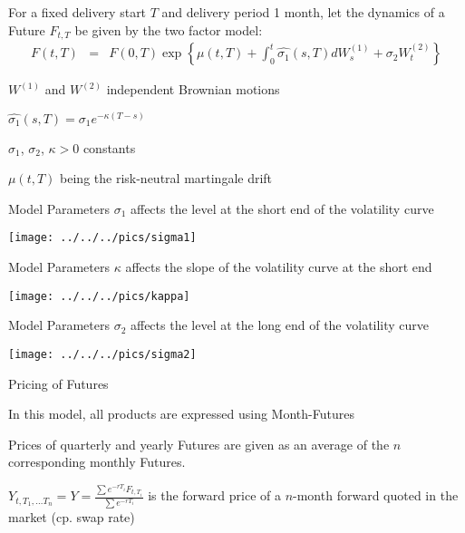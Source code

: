 


	For a fixed delivery start $T$ and delivery period 1 month, let the dynamics of a Future $F_{t,T}$ be given by the two factor model:
\begin{eqnarray*}
F(t,T)& =&F(0,T)\exp\left\{\mu(t,T)  +\int_0^t\hat{\sigma_1}(s,T)dW_s^{(1)}+\sigma_2W_t^{(2)}\right\}
\end{eqnarray*}

	$W^{(1)}$ and $W^{(2)}$ independent Brownian motions

	$\hat{\sigma_1}(s,T)=\sigma_1e^{-\kappa(T-s)}$

	$\sigma_1$, $\sigma_2$, $\kappa>0$ constants

	$\mu(t,T)$ being the risk-neutral martingale drift






{Model Parameters}
$\sigma_1$ affects the level at the short end of the volatility curve

\begin{center}
\texttt{[image: ../../../pics/sigma1]}
\end{center}

{Model Parameters}
$\kappa$ affects the slope of the volatility curve at the short end

\begin{center}
\texttt{[image: ../../../pics/kappa]}
\end{center}

{Model Parameters}
$\sigma_2$ affects the level at the long end of the volatility curve

\begin{center}
\texttt{[image: ../../../pics/sigma2]}
\end{center}

{Pricing of Futures}






	In this model, all products are expressed using Month-Futures

	Prices of quarterly and yearly Futures are given as an
average of the  $n$ corresponding monthly Futures.

	$Y_{t,T_1, \ldots T_n}=Y=\frac{\sum e^{-rT_i}F_{t,T_i}}{\sum e^{-rT_i}}$
is the forward price of a $n$-month forward quoted in the market (cp. swap rate)



